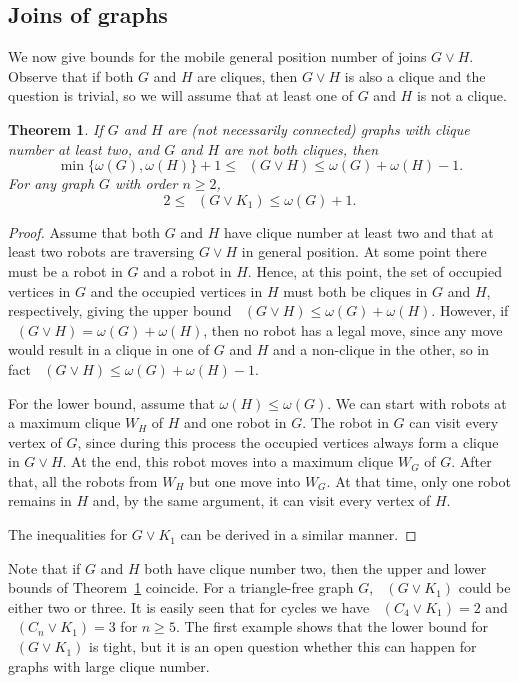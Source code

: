 \documentclass[a4paper,12pt]{article}
\DeclareMathOperator{\mob}{Mob_{gp}}
\newtheorem{theorem}{Theorem}[section]
\theoremstyle{definition}
\begin{document}
	\subsection{Joins of graphs}
	We now give bounds for the mobile general position number of joins $G \vee H$. Observe that if both $G$ and $H$ are cliques, then $G \vee H$ is also a clique and the question is trivial, so we will assume that at least one of $G$ and $H$ is not a clique.
	
	\begin{theorem}
		\label{thm:join}
		If $G$ and $H$ are (not necessarily connected) graphs with clique number at least two, and $G$ and $H$ are not both cliques, then \[ \min \{ \omega(G),\omega (H)\} +1 \leq \mob (G \vee H) \leq \omega (G)+\omega (H)-1.\] For any graph $G$ with order $n \geq 2$, \[  2 \leq \mob (G \vee K_1) \leq \omega (G)+1.\] 
	\end{theorem}
	
	\begin{proof}
		Assume that both $G$ and $H$ have clique number at least two and that at least two robots are traversing $G \vee H$ in general position. At some point there must be a robot in $G$ and a robot in $H$. Hence, at this point, the set of occupied vertices in $G$ and the occupied vertices in $H$ must both be cliques in $G$ and $H$, respectively, giving the upper bound $\mob (G \vee H) \leq \omega (G) + \omega (H)$. However, if $\mob (G \vee H) = \omega (G) + \omega (H)$, then no robot has a legal move, since any move would result in a clique in one of $G$ and $H$ and a non-clique in the other, so in fact $\mob (G \vee H) \leq \omega (G) + \omega (H)-1$.
		
		For the lower bound, assume that $\omega (H) \leq \omega (G)$. We can start with robots at a maximum clique $W_H$ of $H$ and one robot in $G$. The robot in $G$ can visit every vertex of $G$, since during this process the occupied vertices always form a clique in $G \vee H$. At the end, this robot moves into a maximum clique $W_G$ of $G$. After that, all the robots from $W_H$ but one move into $W_G$. At that time, only one robot remains in $H$ and, by the same argument, it can visit every vertex of $H$. 
		
		The inequalities for $G \vee K_1$ can be derived in a similar manner.
	\end{proof}
	
	Note that if $G$ and $H$ both have clique number two, then the upper and lower bounds of Theorem~\ref{thm:join} coincide. For a triangle-free graph $G$, $\mob (G \vee K_1)$ could be either two or three. It is easily seen that for cycles we have $\mob (C_4 \vee K_1) = 2$ and $\mob (C_n \vee K_1) = 3$ for $n \geq 5$. The first example shows that the lower bound for $\mob (G \vee K_1)$ is tight, but it is an open question whether this can happen for graphs with large clique number. 
	
\end{document}
